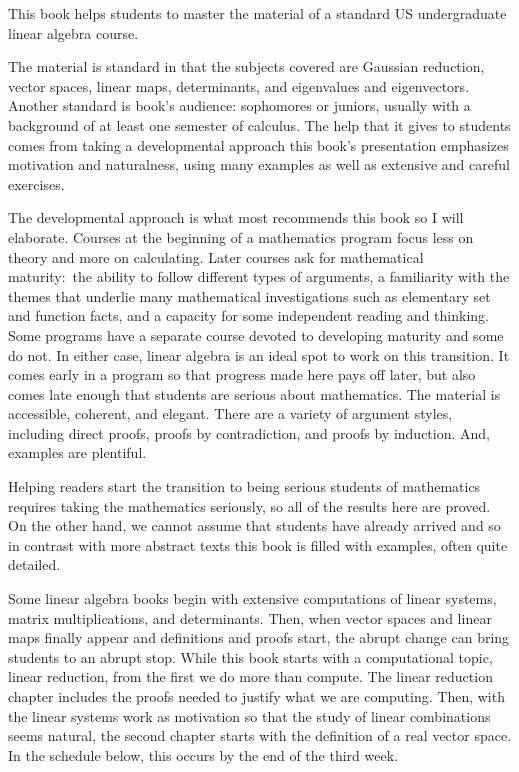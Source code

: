 \thispagestyle{plain}
\setlength{\parskip}{.7ex}
\bigskip
\vspace*{1.25in}
\vspace*{.4in}
\par\noindent
This book helps students to master the material of a standard 
US undergraduate linear algebra course.

The material is standard in that the subjects covered are
Gaussian reduction, 
vector spaces, linear maps,
determinants, and eigenvalues and eigenvectors.
Another standard is book's audience:
sophomores or juniors, usually with a background 
of at least one semester of calculus. 
The help that it gives to students comes from taking a developmental 
approach\Dash 
this book's presentation emphasizes motivation and naturalness, 
using many examples as well as extensive and careful exercises.

The developmental approach is what most recommends this book
so I will elaborate.
Courses at the beginning of a mathematics program
focus less on theory and more on calculating.
Later courses
ask for mathematical maturity:~the ability to follow different 
types of arguments, 
a familiarity with
the themes that underlie many mathematical investigations such as
elementary set and function facts,
and a capacity for some independent reading and thinking.
Some programs have a separate course devoted to developing maturity and
some do not. 
In either case, linear algebra is an ideal spot to work on this transition.
It comes early in a program so that progress made here pays off later,
but also comes late enough that
students are serious about mathematics.
The material is accessible, coherent, and elegant.
There are a variety of argument styles, including 
direct proofs, proofs by
contradiction, and proofs by induction.
And, examples are plentiful.

Helping readers start the transition to being serious students of 
mathematics
requires taking the mathematics seriously, so
all of the results here are proved.
On the other hand, we cannot
assume that students have already arrived
and so 
in contrast with more abstract texts 
this book is filled with examples,
often quite detailed.

Some linear algebra books
begin with extensive computations of linear systems, 
matrix multiplications, 
and determinants.
Then, when 
vector spaces and linear maps finally appear
and definitions and proofs start, the abrupt change
can bring students to an abrupt stop.
While this book starts with
a computational topic, linear reduction, from the first
we do more than compute.
The linear reduction chapter
includes the proofs needed to justify what we are computing.
Then, with the linear systems work as motivation
so that the study of linear combinations seems natural,
the second chapter starts with the definition of a real vector space.
In the schedule below, this occurs by the end of the third week.

